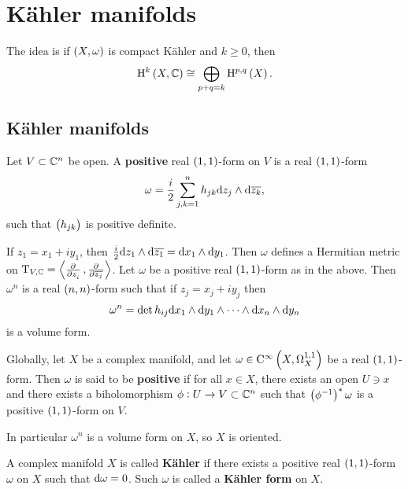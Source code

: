 \pagebreak

\section{K\"ahler manifolds}

The idea is if $ \br{X, \omega} $ is compact K\"ahler and $ k \ge 0 $, then
$$ \H^k\br{X, \CC} \cong \bigoplus_{p + q = k} \H^{p, q}\br{X}. $$

\subsection{K\"ahler manifolds}

\begin{definition}
Let $ V \subset \mathbb{C}^n $ be open. A \textbf{positive} real $ \br{1, 1} $-form on $ V $ is a real $ \br{1, 1} $-form
$$ \omega = \dfrac{i}{2}\sum_{j, k = 1}^n h_{jk} \mathrm{d} z_j \wedge \mathrm{d}\overline{z_k}, $$
such that $ \br{h_{jk}} $ is positive definite.
\end{definition}

If $ z_1 = x_1 + iy_1 $, then $ \tfrac{i}{2} \mathrm{d} z_1 \wedge \mathrm{d}\overline{z_1} = \mathrm{d} x_1 \wedge \mathrm{d} y_1 $. Then $ \omega $ defines a Hermitian metric on $ \T_{V, \CC} = \abr{\tpd{}{z_i}, \tpd{}{\overline{z_j}}} $. Let $ \omega $ be a positive real $ \br{1, 1} $-form as in the above. Then $ \omega^n $ is a real $ \br{n, n} $-form such that if $ z_j = x_j + iy_j $ then
$$ \omega^n = \det h_{ij} \mathrm{d} x_1 \wedge \mathrm{d} y_1 \wedge \dots \wedge \mathrm{d} x_n \wedge \mathrm{d} y_n $$
is a volume form.

\begin{definition}
Globally, let $ X $ be a complex manifold, and let $ \omega \in \C^\infty\br{X, \Omega_X^{1, 1}} $ be a real $ \br{1, 1} $-form. Then $ \omega $ is said to be \textbf{positive} if for all $ x \in X $, there exists an open $ U \ni x $ and there exists a biholomorphism $ \phi : U \to V \subset \mathbb{C}^n $ such that $ \br{\phi^{-1}}^*\omega $ is a positive $ \br{1, 1} $-form on $ V $.
\end{definition}

In particular $ \omega^n $ is a volume form on $ X $, so $ X $ is oriented.

\begin{definition}
A complex manifold $ X $ is called \textbf{K\"ahler} if there exists a positive real $ \br{1, 1} $-form $ \omega $ on $ X $ such that $ \mathrm{d}\omega = 0 $. Such $ \omega $ is called a \textbf{K\"ahler form} on $ X $.
\end{definition}

